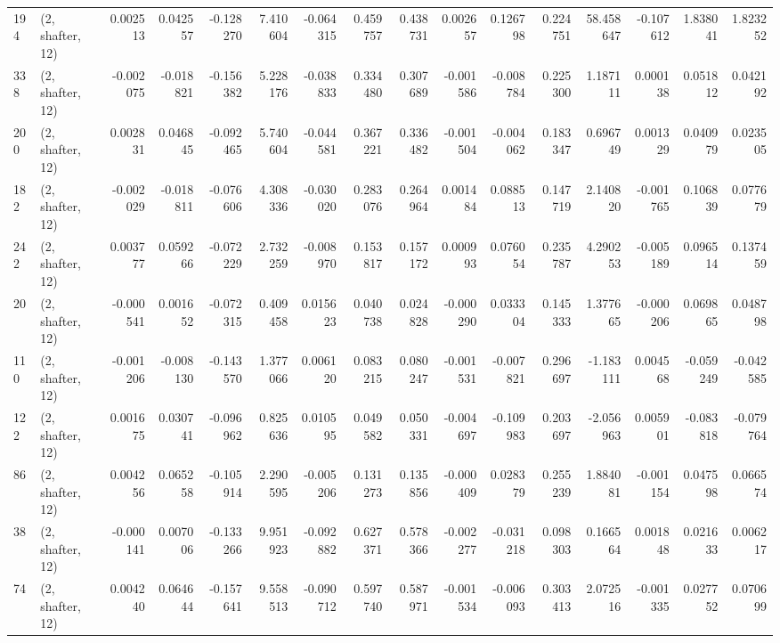 \begin{tabular}{llrrrrrrrrrrrrrr}
194 &  (2, shafter, 12) &   0.002513 &  0.042557 & -0.128270 &    7.410604 & -0.064315 &   0.459757 &  0.438731 &  0.002657 &  0.126798 &  0.224751 &   58.458647 & -0.107612 &  1.838041 &  1.823252 \\
338 &  (2, shafter, 12) &  -0.002075 & -0.018821 & -0.156382 &    5.228176 & -0.038833 &   0.334480 &  0.307689 & -0.001586 & -0.008784 &  0.225300 &    1.187111 &  0.000138 &  0.051812 &  0.042192 \\
200 &  (2, shafter, 12) &   0.002831 &  0.046845 & -0.092465 &    5.740604 & -0.044581 &   0.367221 &  0.336482 & -0.001504 & -0.004062 &  0.183347 &    0.696749 &  0.001329 &  0.040979 &  0.023505 \\
182 &  (2, shafter, 12) &  -0.002029 & -0.018811 & -0.076606 &    4.308336 & -0.030020 &   0.283076 &  0.264964 &  0.001484 &  0.088513 &  0.147719 &    2.140820 & -0.001765 &  0.106839 &  0.077679 \\
242 &  (2, shafter, 12) &   0.003777 &  0.059266 & -0.072229 &    2.732259 & -0.008970 &   0.153817 &  0.157172 &  0.000993 &  0.076054 &  0.235787 &    4.290253 & -0.005189 &  0.096514 &  0.137459 \\
20  &  (2, shafter, 12) &  -0.000541 &  0.001652 & -0.072315 &    0.409458 &  0.015623 &   0.040738 &  0.024828 & -0.000290 &  0.033304 &  0.145333 &    1.377665 & -0.000206 &  0.069865 &  0.048798 \\
110 &  (2, shafter, 12) &  -0.001206 & -0.008130 & -0.143570 &    1.377066 &  0.006120 &   0.083215 &  0.080247 & -0.001531 & -0.007821 &  0.296697 &   -1.183111 &  0.004568 & -0.059249 & -0.042585 \\
122 &  (2, shafter, 12) &   0.001675 &  0.030741 & -0.096962 &    0.825636 &  0.010595 &   0.049582 &  0.050331 & -0.004697 & -0.109983 &  0.203697 &   -2.056963 &  0.005901 & -0.083818 & -0.079764 \\
86  &  (2, shafter, 12) &   0.004256 &  0.065258 & -0.105914 &    2.290595 & -0.005206 &   0.131273 &  0.135856 & -0.000409 &  0.028379 &  0.255239 &    1.884081 & -0.001154 &  0.047598 &  0.066574 \\
38  &  (2, shafter, 12) &  -0.000141 &  0.007006 & -0.133266 &    9.951923 & -0.092882 &   0.627371 &  0.578366 & -0.002277 & -0.031218 &  0.098303 &    0.166564 &  0.001848 &  0.021633 &  0.006217 \\
74  &  (2, shafter, 12) &   0.004240 &  0.064644 & -0.157641 &    9.558513 & -0.090712 &   0.597740 &  0.587971 & -0.001534 & -0.006093 &  0.303413 &    2.072516 & -0.001335 &  0.027752 &  0.070699 \\

\end{tabular}
